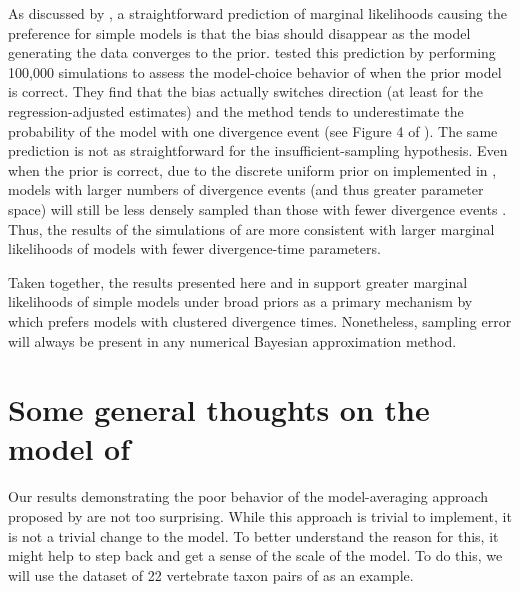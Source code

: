 \documentclass[letterpaper,12pt]{article}
\begin{document}
\begin{linenumbers}
As discussed by \citet{Oaks2012}, a straightforward prediction of marginal
likelihoods causing the preference for simple models is that the bias should
disappear as the model generating the data converges to the prior.
\citet{Oaks2012} tested this prediction by performing 100,000 simulations to
assess the model-choice behavior of \msb when the prior model is correct.
They find that the bias actually switches direction (at least for the
regression-adjusted estimates) and the method tends to underestimate the
probability of the model with one divergence event (see Figure 4 of
\citet{Oaks2012}).
The same prediction is not as straightforward for the insufficient-sampling
hypothesis.
Even when the prior is correct, due to the discrete uniform prior on
\numt{} implemented in \msb, models with larger numbers of divergence
events (and thus greater parameter space) will still be less densely
sampled than those with fewer divergence events \citep{Oaks2012}.
Thus, the results of the simulations of \citet{Oaks2012} are more consistent
with larger marginal likelihoods of models with fewer divergence-time
parameters.

Taken together, the results presented here and in \citet{Oaks2012} support
greater marginal likelihoods of simple models under broad priors as a primary
mechanism by which \msb prefers models with clustered divergence times.
Nonetheless, sampling error will always be present in any numerical
Bayesian approximation method.




\section*{Some general thoughts on the model of \msb}
Our results demonstrating the poor behavior of the model-averaging approach
proposed by \citet{Hickerson2013} are not too surprising.
While this approach is trivial to implement, it is not a trivial change
to the \msb model.
To better understand the reason for this, it might help to step back and get a
sense of the scale of the \msb model.
To do this, we will use the dataset of 22 vertebrate taxon pairs of
\citet{Oaks2012} as an example.


\end{linenumbers}
\end{document}
